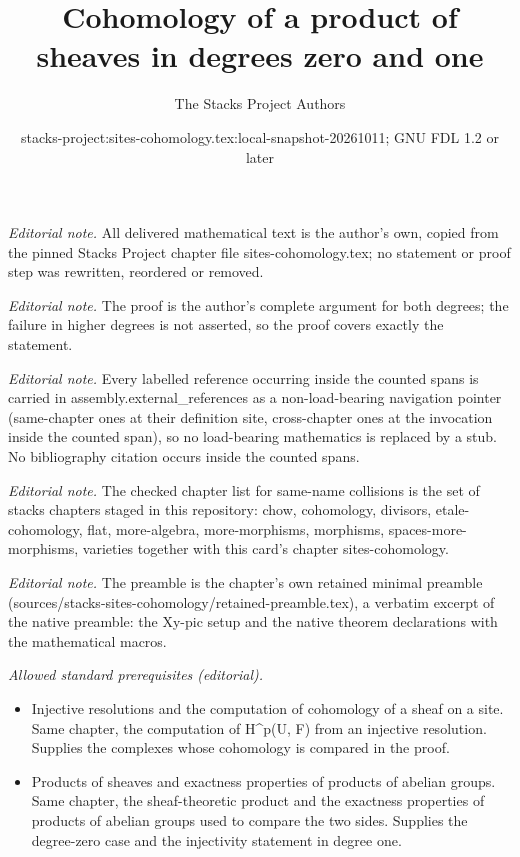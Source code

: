 \documentclass[10pt,a4paper]{amsart}
\title{Cohomology of a product of sheaves in degrees zero and one}
\author{The Stacks Project Authors}
\date{stacks-project:sites-cohomology.tex:local-snapshot-20261011; GNU FDL 1.2 or later}
\theoremstyle{plain}
\theoremstyle{definition}
\theoremstyle{remark}
\numberwithin{equation}{subsection}
\begin{document}
\maketitle
\noindent\textit{Editorial note.} All delivered mathematical text is the author's own, copied from the pinned Stacks Project chapter file sites-cohomology.tex; no statement or proof step was rewritten, reordered or removed.\par\medskip
\noindent\textit{Editorial note.} The proof is the author's complete argument for both degrees; the failure in higher degrees is not asserted, so the proof covers exactly the statement.\par\medskip
\noindent\textit{Editorial note.} Every labelled reference occurring inside the counted spans is carried in assembly.external\_references as a non-load-bearing navigation pointer (same-chapter ones at their definition site, cross-chapter ones at the invocation inside the counted span), so no load-bearing mathematics is replaced by a stub. No bibliography citation occurs inside the counted spans.\par\medskip
\noindent\textit{Editorial note.} The checked chapter list for same-name collisions is the set of stacks chapters staged in this repository: chow, cohomology, divisors, etale-cohomology, flat, more-algebra, more-morphisms, morphisms, spaces-more-morphisms, varieties together with this card's chapter sites-cohomology.\par\medskip
\noindent\textit{Editorial note.} The preamble is the chapter's own retained minimal preamble (sources/stacks-sites-cohomology/retained-preamble.tex), a verbatim excerpt of the native preamble: the Xy-pic setup and the native theorem declarations with the mathematical macros.\par\medskip
\noindent\textit{Allowed standard prerequisites (editorial).}\begin{itemize}
\item Injective resolutions and the computation of cohomology of a sheaf on a site. Same chapter, the computation of H\textasciicircum{}p(U, F) from an injective resolution. Supplies the complexes whose cohomology is compared in the proof.
\item Products of sheaves and exactness properties of products of abelian groups. Same chapter, the sheaf-theoretic product and the exactness properties of products of abelian groups used to compare the two sides. Supplies the degree-zero case and the injectivity statement in degree one.
\end{itemize}\medskip
\end{document}
